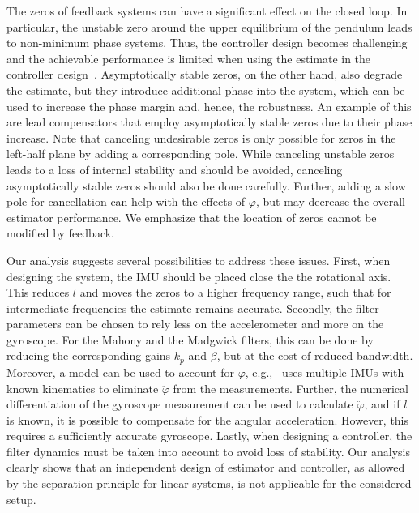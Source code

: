The zeros of feedback systems can have a significant effect on the closed loop.
In particular, the unstable zero around the upper equilibrium of the pendulum leads to non-minimum phase systems. 
Thus, the controller design becomes challenging and the achievable performance is limited when using the estimate in the controller design~\cite{Qiu1993,Freudenberg1985,Cheng1980,Misra1989}.
Asymptotically stable zeros, on the other hand, also degrade the estimate, but they introduce additional phase into the system, which can be used to increase the phase margin and, hence, the robustness.
An example of this are lead compensators that employ asymptotically stable zeros due to their phase increase.
Note that canceling undesirable zeros is only possible for zeros in the left-half plane by adding a corresponding pole.
While canceling unstable zeros leads to a loss of internal stability and should be avoided, canceling asymptotically stable zeros should also be done carefully.
Further, adding a slow pole for cancellation can help with the effects of $\ddot{\varphi}$, but may decrease the overall estimator performance.
We emphasize that the location of zeros cannot be modified by feedback.

Our analysis suggests several possibilities to address these issues.
First, when designing the system, the \ac{IMU} should be placed close the the rotational axis.
This reduces $l$ and moves the zeros to a higher frequency range, such that for intermediate frequencies the estimate remains accurate.
Secondly, the filter parameters can be chosen to rely less on the accelerometer and more on the gyroscope. 
For the Mahony and the Madgwick filters, this can be done by reducing the corresponding gains $k_p$ and $\beta$, but at the cost of reduced bandwidth.
Moreover, a model can be used to account for $\ddot{\varphi}$, e.g.,~\cite{Gajamohan2012} uses multiple \acp{IMU} with known kinematics to eliminate $\ddot{\varphi}$ from the measurements.
Further, the numerical differentiation of the gyroscope measurement can be used to calculate $\ddot{\varphi}$, and if $l$ is known, it is possible to compensate for the angular acceleration.
However, this requires a sufficiently accurate gyroscope.
Lastly, when designing a controller, the filter dynamics must be taken into account to avoid loss of stability. 
Our analysis clearly shows that an independent design of estimator and controller, as allowed by the separation principle for linear systems, is not applicable for the considered setup.
